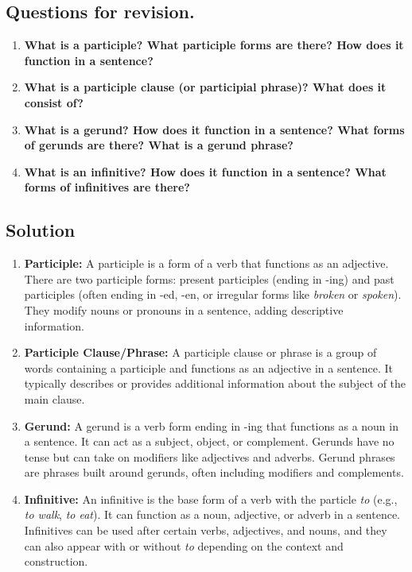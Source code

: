 \subsection*{Questions for revision.}
\begin{enumerate}
      \item \textbf{What is a participle? What participle forms are there? How does it function in a sentence?}
      \item \textbf{What is a participle clause (or participial phrase)? What does it consist of?}
      \item \textbf{What is a gerund? How does it function in a sentence? What forms of gerunds are there? What is a gerund phrase?}
      \item \textbf{What is an infinitive? How does it function in a sentence? What forms of infinitives are there?}
\end{enumerate}

\subsection*{Solution}
\begin{enumerate}
      \item \textbf{Participle:} A participle is a form of a verb that functions as an adjective. There are two participle forms: present participles (ending in -ing) and past participles (often ending in -ed, -en, or irregular forms like \textit{broken} or \textit{spoken}). They modify nouns or pronouns in a sentence, adding descriptive information.

      \item \textbf{Participle Clause/Phrase:} A participle clause or phrase is a group of words containing a participle and functions as an adjective in a sentence. It typically describes or provides additional information about the subject of the main clause.

      \item \textbf{Gerund:} A gerund is a verb form ending in -ing that functions as a noun in a sentence. It can act as a subject, object, or complement. Gerunds have no tense but can take on modifiers like adjectives and adverbs. Gerund phrases are phrases built around gerunds, often including modifiers and complements.

      \item \textbf{Infinitive:} An infinitive is the base form of a verb with the particle \textit{to} (e.g., \textit{to walk}, \textit{to eat}). It can function as a noun, adjective, or adverb in a sentence. Infinitives can be used after certain verbs, adjectives, and nouns, and they can also appear with or without \textit{to} depending on the context and construction.
\end{enumerate}

